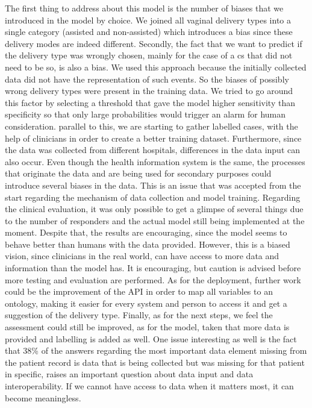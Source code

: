 The first thing to address about this model is the number of biases that we introduced in the model by choice. We joined all vaginal delivery types into a single category (assisted and non-assisted) which introduces a  bias since these delivery modes are indeed different. Secondly, the fact that we want to predict if the delivery type was wrongly chosen, mainly for the case of a \ac{cs} that did not need to be so, is also a bias. We used this approach because the initially collected data did not have the representation of such events. So the biases of possibly wrong delivery types were present in the training data. We tried to go around this factor by selecting a threshold that gave the model higher sensitivity than specificity so that only large probabilities would trigger an alarm for human consideration. parallel to this, we are starting to gather labelled cases, with the help of clinicians in order to create a better training dataset.
Furthermore, since the data was collected from different hospitals,  differences in the data input can also occur. Even though the health information system is the same, the processes that originate the data and are being used for secondary purposes could introduce several biases in the data. This is an issue that was accepted from the start regarding the mechanism of data collection and model training.
Regarding the clinical evaluation, it was only possible to get a glimpse of several things due to the number of responders and the actual model still being implemented at the moment. Despite that, the results are encouraging, since the model seems to behave better than humans with the data provided. However, this is a biased vision, since clinicians in the real world, can have access to more data and information than the model has. It is encouraging, but caution is advised before more testing and evaluation are performed.
As for the deployment, further work could be the improvement of the API in order to map all variables to an ontology, making it easier for every system and person to access it and get a suggestion of the delivery type.
Finally, as for the next steps, we feel the assessment could still be improved, as for the model, taken that more data is provided and labelling is added as well. One issue interesting as well is the fact that 38\% of the answers regarding the most important data element missing from the patient record is data that is being collected but was missing for that patient in specific, raises an important question about data input and data interoperability. If we cannot have access to data when it matters most, it can become meaningless.


